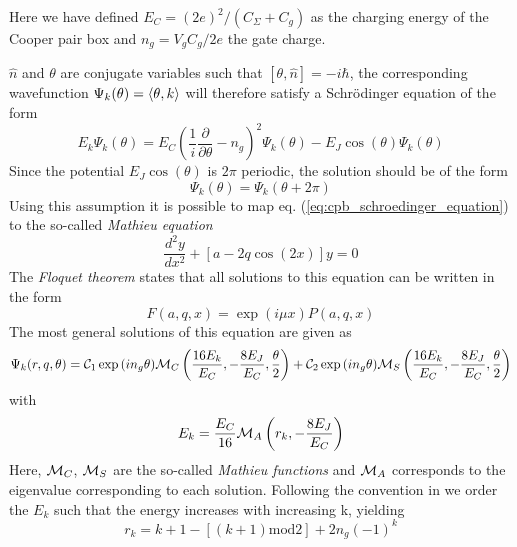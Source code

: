 Here we have defined $E_C = (2e)^2 / (C_\Sigma+C_g)$ as the charging energy of the Cooper pair box and $n_g=V_g C_g /2e $ the gate charge.

\smallskip

$\hat{n}$ and $\theta$ are conjugate variables such that $[\theta,\hat{n}]=-i\hbar$, the corresponding wavefunction $\Psi_k(\theta) = \left< \theta,k \right>$ will therefore satisfy a Schrödinger equation of the form
%
\begin{equation}
E_k \Psi_k(\theta) = E_C(\frac{1}{i}\frac{\partial}{\partial \theta}-n_g)^2 \Psi_k(\theta) - E_J \cos{\left(\theta\right)}\Psi_k(\theta) \label{eq:cpb_schroedinger_equation}
\end{equation}
%
Since the potential $E_J\cos{(\theta)}$ is $2\pi$ periodic, the solution should be of the form
%
\begin{equation}
\Psi_k(\theta) = \Psi_k(\theta+2\pi)
\end{equation}
%
Using this assumption it is possible to map eq. (\ref{eq:cpb_schroedinger_equation}) to the so-called {\it Mathieu  equation}
%
\begin{equation}
\frac{d^2y}{dx^2}+\left[a-2q\cos{(2x)}\right]y = 0
\end{equation}
%
The {\it Floquet theorem} states that all solutions to this equation can be written in the form
%
\begin{equation}
F(a,q,x) = \exp{\left(i\mu x\right)}P(a,q,x)
\end{equation}
%
The most general solutions of this equation are given as \citep{cottet_implementation_2002}
%
\begin{equation}
\Psi_k(r,q,\theta) = \mcal{C}_1\exp{\left(i n_g \theta \right)}\mcal{M}_C\left(\frac{16E_k}{E_C},-\frac{8E_J}{E_C},\frac{\theta}{2}\right)+\mcal{C}_2\exp{\left(i n_g \theta \right)}\mcal{M}_S \left(\frac{16 E_k}{E_C},-\frac{8 E_J}{E_C},\frac{\theta}{2}\right)
\end{equation}
%
with 
%
\begin{equation}
E_k = \frac{E_C}{16}\mcal{M}_A \left(r_k,-\frac{8 E_J}{E_C} \right)
\end{equation}
%
Here, $\mcal{M}_C$, $\mcal{M}_S$ are the so-called {\it Mathieu functions} and $\mcal{M}_A$ corresponds to the eigenvalue corresponding to each solution. Following the convention in \citep{cottet_implementation_2002} we order the $E_k$ such that the energy increases with increasing k, yielding
%
\begin{equation}
r_k = k+1-\left[(k+1)\mathrm{mod}2\right]+2n_g(-1)^k
\end{equation}
%

